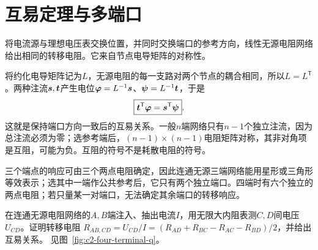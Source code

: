 \section{互易定理与多端口}\label{sec:c2-multiport}
将电流源与理想电压表交换位置，并同时交换端口的参考方向，线性无源电阻网络给出相同的转移电阻。它来自节点电导矩阵的对称性。

将约化电导矩阵记为$L$，无源电阻的每一支路对两个节点的耦合相同，所以$L=L^{\mathsf T}$。两种注流$\bm{s},\bm{t}$产生电位$\bm{\varphi}=L^{-1}\bm{s}$、$\bm{\psi}=L^{-1}\bm{t}$，于是
\[
 \boxed{\bm{t}^{\mathsf T}\bm{\varphi}
 =\bm{s}^{\mathsf T}\bm{\psi}}.
\]
这就是保持端口方向一致后的互易关系。一般$n$端网络只有$n-1$个独立注流，因为总注流必须为零；选参考端后，$(n-1)\times(n-1)$电阻矩阵对称，其非对角项是互阻，可能为负。互阻的符号不是耗散电阻的符号。

三个端点的响应可由三个两点电阻确定，因此连通无源三端网络能用星形或三角形等效表示；选其中一端作公共参考后，它只有两个独立端口。四端时有六个独立的两点电阻；若只量某一对端口，无法确定其余端口的转移响应。

\begin{example}[四端电压与六个两点电阻]\label{ex:c2-four-terminal}
在连通无源电阻网络的$A,B$端注入、抽出电流$I$，用无限大内阻表测$C,D$间电压$U_{CD}$。证明转移电阻
$R_{AB,CD}=U_{CD}/I=(R_{AD}+R_{BC}-R_{AC}-R_{BD})/2$，并给出互易关系。 见图~\ref{fig:c2-four-terminal-q}。
\end{example}

